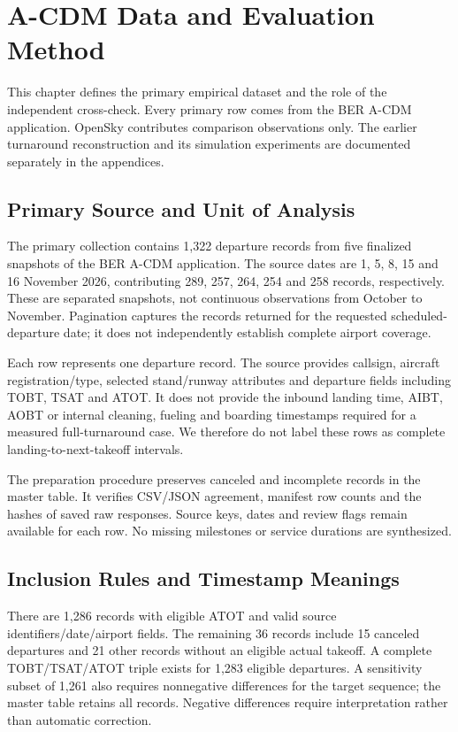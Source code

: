 \chapter{A-CDM Data and Evaluation Method}
\label{ch:methods}
This chapter defines the primary empirical dataset and the role of the independent cross-check. Every primary row comes from the BER A-CDM application. OpenSky contributes comparison observations only. The earlier turnaround reconstruction and its simulation experiments are documented separately in the appendices.

\section{Primary Source and Unit of Analysis}
The primary collection contains 1,322 departure records from five finalized snapshots of the BER A-CDM application. The source dates are 1, 5, 8, 15 and 16 November 2026, contributing 289, 257, 264, 254 and 258 records, respectively. These are separated snapshots, not continuous observations from October to November. Pagination captures the records returned for the requested scheduled-departure date; it does not independently establish complete airport coverage.

Each row represents one departure record. The source provides callsign, aircraft registration/type, selected stand/runway attributes and departure fields including TOBT, TSAT and ATOT. It does not provide the inbound landing time, AIBT, AOBT or internal cleaning, fueling and boarding timestamps required for a measured full-turnaround case. We therefore do not label these rows as complete landing-to-next-takeoff intervals.

The preparation procedure preserves canceled and incomplete records in the master table. It verifies CSV/JSON agreement, manifest row counts and the hashes of saved raw responses. Source keys, dates and review flags remain available for each row. No missing milestones or service durations are synthesized.

\section{Inclusion Rules and Timestamp Meanings}
There are 1,286 records with eligible ATOT and valid source identifiers/date/airport fields. The remaining 36 records include 15 canceled departures and 21 other records without an eligible actual takeoff. A complete TOBT/TSAT/ATOT triple exists for 1,283 eligible departures. A sensitivity subset of 1,261 also requires nonnegative differences for the target sequence; the master table retains all records. Negative differences require interpretation rather than automatic correction.

